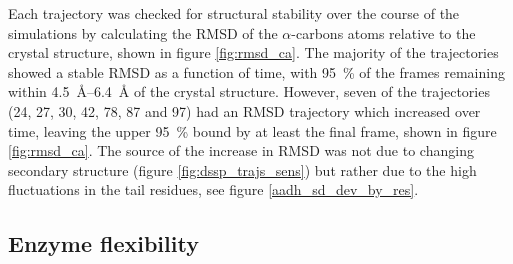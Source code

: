 Each trajectory was checked for structural stability over the course of the simulations by calculating the RMSD of the $\alpha$-carbons atoms relative to the crystal structure, shown in figure \ref{fig:rmsd_ca}. The majority of the trajectories showed a stable RMSD as a function of time, with \SI{95}{\percent} of the frames remaining within \SIrange{4.5}{6.4}{\angstrom} of the crystal structure. However, seven of the trajectories (24, 27, 30, 42, 78, 87 and 97) had an RMSD trajectory which increased over time, leaving the upper \SI{95}{\percent} bound by at least the final frame, shown in figure \ref{fig:rmsd_ca}. The source of the increase in RMSD was not due to changing secondary structure (figure \ref{fig:dssp_trajs_sens}) but rather due to the high fluctuations in the tail residues, see figure \ref{aadh_sd_dev_by_res}. 

\subsection{Enzyme flexibility}

